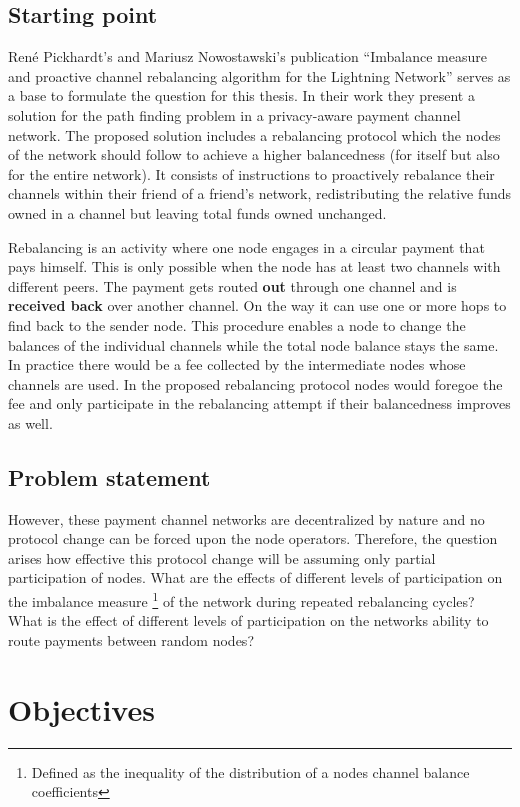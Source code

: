 \documentclass[final]{fhnwreport}       %
\begin{document}
\subsection{Starting point}
René Pickhardt's and Mariusz Nowostawski's publication ``Imbalance measure and proactive channel rebalancing algorithm for the Lightning Network'' \cite{pickhardt_imbalance_2019} serves as a base to formulate the question for this thesis. In their work they present a solution for the path finding problem in a privacy-aware payment channel network. The proposed solution includes a rebalancing protocol which the nodes of the network should follow to achieve a higher balancedness (for itself but also for the entire network). It consists of instructions to proactively rebalance their channels within their friend of a friend's network, redistributing the relative funds owned in a channel but leaving total funds owned unchanged.

Rebalancing is an activity where one node engages in a circular payment that pays himself. This is only possible when the node has at least two channels with different peers. The payment gets routed \textbf{out} through one channel and is \textbf{received back} over another channel. On the way it can use one or more hops to find back to the sender node. This procedure enables a node to change the balances of the individual channels while the total node balance stays the same. In practice there would be a fee collected by the intermediate nodes whose channels are used. In the proposed rebalancing protocol nodes would foregoe the fee and only participate in the rebalancing attempt if their balancedness improves as well.

\subsection{Problem statement}
However, these payment channel networks are decentralized by nature and no protocol change can be forced upon the node operators. Therefore, the question arises how effective this protocol change will be assuming only partial participation of nodes. What are the effects of different levels of participation on the imbalance measure \footnote{Defined as the inequality of the distribution of a nodes channel balance coefficients} of the network during repeated rebalancing cycles? What is the effect of different levels of participation on the networks ability to route payments between random nodes? 

\section{Objectives}
\end{document}
